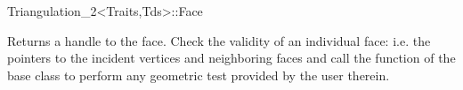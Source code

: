 \begin{ccRefClass}{Triangulation_2<Traits,Tds>::Face}
 
{Returns a handle to the face.}
\ccGlue
{} 
{Check the validity of an individual face:
i.e. the pointers to the incident vertices
and neighboring faces
 and call the 
function of the base class to perform any geometric test provided by the user
therein.}


\ccSeeAlso
{} \\
 \\
 \\
 \\
 \\
 \\
\end{ccRefClass}


